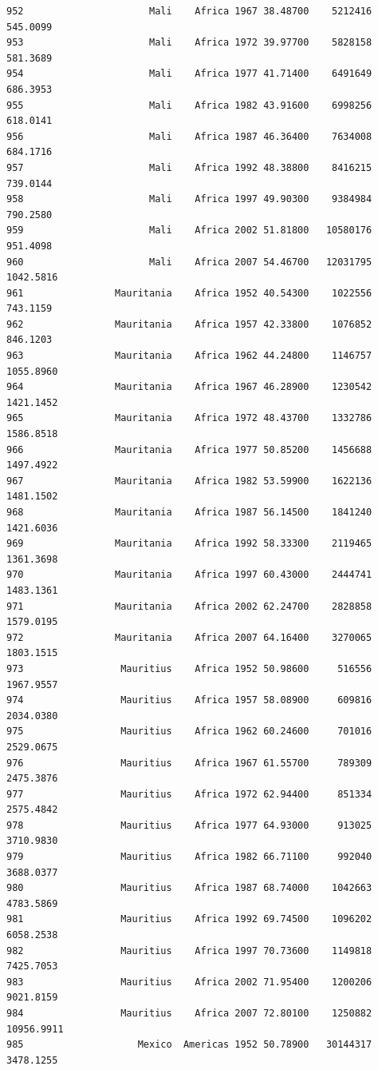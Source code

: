 \documentclass[
  letterpaper,
  DIV=11,
  numbers=noendperiod]{scrreprt}
\begin{document}
\begin{verbatim}
952                      Mali    Africa 1967 38.48700    5212416    545.0099
953                      Mali    Africa 1972 39.97700    5828158    581.3689
954                      Mali    Africa 1977 41.71400    6491649    686.3953
955                      Mali    Africa 1982 43.91600    6998256    618.0141
956                      Mali    Africa 1987 46.36400    7634008    684.1716
957                      Mali    Africa 1992 48.38800    8416215    739.0144
958                      Mali    Africa 1997 49.90300    9384984    790.2580
959                      Mali    Africa 2002 51.81800   10580176    951.4098
960                      Mali    Africa 2007 54.46700   12031795   1042.5816
961                Mauritania    Africa 1952 40.54300    1022556    743.1159
962                Mauritania    Africa 1957 42.33800    1076852    846.1203
963                Mauritania    Africa 1962 44.24800    1146757   1055.8960
964                Mauritania    Africa 1967 46.28900    1230542   1421.1452
965                Mauritania    Africa 1972 48.43700    1332786   1586.8518
966                Mauritania    Africa 1977 50.85200    1456688   1497.4922
967                Mauritania    Africa 1982 53.59900    1622136   1481.1502
968                Mauritania    Africa 1987 56.14500    1841240   1421.6036
969                Mauritania    Africa 1992 58.33300    2119465   1361.3698
970                Mauritania    Africa 1997 60.43000    2444741   1483.1361
971                Mauritania    Africa 2002 62.24700    2828858   1579.0195
972                Mauritania    Africa 2007 64.16400    3270065   1803.1515
973                 Mauritius    Africa 1952 50.98600     516556   1967.9557
974                 Mauritius    Africa 1957 58.08900     609816   2034.0380
975                 Mauritius    Africa 1962 60.24600     701016   2529.0675
976                 Mauritius    Africa 1967 61.55700     789309   2475.3876
977                 Mauritius    Africa 1972 62.94400     851334   2575.4842
978                 Mauritius    Africa 1977 64.93000     913025   3710.9830
979                 Mauritius    Africa 1982 66.71100     992040   3688.0377
980                 Mauritius    Africa 1987 68.74000    1042663   4783.5869
981                 Mauritius    Africa 1992 69.74500    1096202   6058.2538
982                 Mauritius    Africa 1997 70.73600    1149818   7425.7053
983                 Mauritius    Africa 2002 71.95400    1200206   9021.8159
984                 Mauritius    Africa 2007 72.80100    1250882  10956.9911
985                    Mexico  Americas 1952 50.78900   30144317   3478.1255

\end{verbatim}
\end{document}
